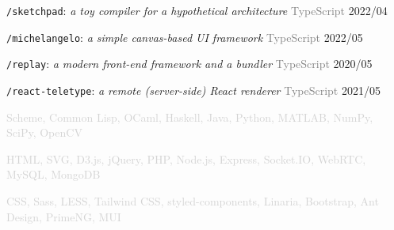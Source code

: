 \documentclass[10pt]{article}
\begin{document}
\vspace{0.5em}
\texttt{/sketchpad}: \textit{a toy compiler for a hypothetical architecture} \hfill \textcolor{gray}{TypeScript} 2022/04

\vspace{0.5em}
\texttt{/michelangelo}: \textit{a simple canvas-based UI framework} \hfill \textcolor{gray}{TypeScript}  2022/05

\vspace{0.5em}
\texttt{/replay}: \textit{a modern front-end framework and a bundler} \hfill \textcolor{gray}{TypeScript} 2020/05

\vspace{0.5em}
\texttt{/react-teletype}: \textit{a remote (server-side) React renderer} \hfill \textcolor{gray}{TypeScript} 2021/05

\vspace{2em}

\textcolor{lightgray}{Scheme, Common Lisp, OCaml, Haskell, Java, Python, MATLAB, NumPy, SciPy, OpenCV}

\textcolor{lightgray}{HTML, SVG, D3.js, jQuery, PHP, Node.js, Express, Socket.IO, WebRTC, MySQL, MongoDB}

\textcolor{lightgray}{CSS, Sass, LESS, Tailwind CSS, styled-components, Linaria, Bootstrap, Ant Design, PrimeNG, MUI}
\end{document}
